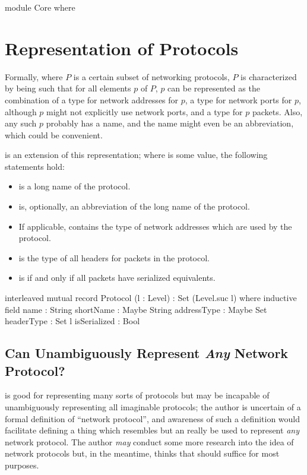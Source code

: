 \documentclass{report}
\begin{document}
\begin{code}
module Core where
\end{code}

\chapter{Representation of Protocols}
Formally, where \(P\) is a certain subset of networking protocols, \(P\) is characterized by being such that for all elements \(p\) of \(P\), \(p\) can be represented as the combination of a type for network addresses for \(p\), a type for network ports for \(p\), although \(p\) might not explicitly use network ports, and a type for \(p\) packets.  Also, any such \(p\) probably has a name, and the name might even be an abbreviation, which could be convenient.

 is an extension of this representation; where  is some   value, the following statements hold:
\begin{itemize}
  \item {}  is a long name of the  protocol.
  \item {}  is, optionally, an abbreviation of the long name of the  protocol.
  \item If applicable,   contains the type of network addresses which are used by the  protocol.
  \item {}  is the type of all headers for packets in the  protocol.
  \item {}  is  if and only if all  packets have serialized equivalents.
\end{itemize}

\begin{code}
  interleaved mutual
    record Protocol (l : Level) : Set (Level.suc l) where
      inductive
      field
        name : String
        shortName : Maybe String
        addressType : Maybe Set
        headerType : Set l
        isSerialized : Bool
\end{code}

\section{Can  Unambiguously Represent \emph{Any} Network Protocol?}
 is good for representing many sorts of protocols but may be incapable of unambiguously representing all imaginable protocols; the author is uncertain of a formal definition of ``network protocol'', and awareness of such a definition would facilitate defining a thing which resembles  but an really be used to represent \emph{any} network protocol.  The author \emph{may} conduct some more research into the idea of network protocols but, in the meantime, thinks that  should suffice for most purposes.
\end{document}
